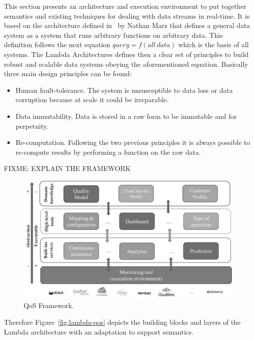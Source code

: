 This section presents an architecture and execution environment to put together 
semantics and existing techniques for dealing with data streams in real-time. 
It is based on the architecture defined in~\cite{BigDataManing} by Nathan Marz that defines 
a general data system as a system that runs arbitrary functions on arbitrary data. This definition 
follows the next equation $query=f(all\,data)$ which is the basis of all systems. The Lambda 
Architectures defines then a clear set of principles to build robust and scalable data 
systems obeying the aforementioned equation. Basically three main design principles 
can be found:
\begin{itemize}
 \item Human fault-tolerance. The system is unsusceptible to data loss or data corruption because at scale it could be irreparable.
 \item Data immutability. Data is stored in a raw form to be immutable and for perpetuity.
 \item Re-computation. Following the two previous principles it is always possible 
 to re-compute results by performing a function on the raw data.
\end{itemize}

FIXME: EXPLAIN THE FRAMEWORK

\begin{figure}[!ht]
\centering
	\includegraphics[width=12cm]{./imgs/qos-framework}
 \caption{QoS Framework.}
 \label{fig:qos-framework}
\end{figure}



Therefore Figure~\ref{fig:lambda-qos} depicts the building blocks and layers of the Lambda architecture with 
an adaptation to support semantics. 

